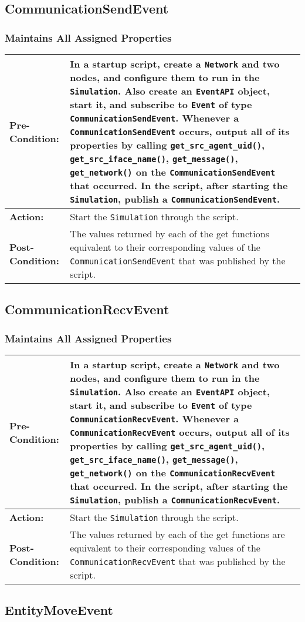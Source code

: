 \documentclass[titlepage]{article}
\newcommand{\testcase}[3]{
    \begin{center}
    \begin{tabular}{| l | p{0.7\textwidth}|}
        \hline
        \rowcolor[gray]{0.8}\textbf{Pre-Condition:} & #1 \\ \hline
        \textbf{Action:} & #2 \\ \hline
        \rowcolor[gray]{0.8}\textbf{Post-Condition:} & #3 \\ \hline
    \end{tabular}
    \end{center}
}
\begin{document}
\subsection{CommunicationSendEvent}
\subsubsection{Maintains All Assigned Properties}
\testcase{In a startup script, create a \texttt{Network} and two nodes, and configure them to run in the \texttt{Simulation}. Also create an \texttt{EventAPI} object, start it, and subscribe to \texttt{Event} of type \texttt{CommunicationSendEvent}. Whenever a \texttt{CommunicationSendEvent} occurs, output all of its properties by calling \texttt{get\_src\_agent\_uid()}, \texttt{get\_src\_iface\_name()}, \texttt{get\_message()}, \texttt{get\_network()} on the \texttt{CommunicationSendEvent} that occurred. In the script, after starting the \texttt{Simulation}, publish a \texttt{CommunicationSendEvent}.}{Start the \texttt{Simulation} through the script.}{The values returned by each of the get functions equivalent to their corresponding values of the \texttt{CommunicationSendEvent} that was published by the script.}

\subsection{CommunicationRecvEvent}
\subsubsection{Maintains All Assigned Properties}
\testcase{In a startup script, create a \texttt{Network} and two nodes, and configure them to run in the \texttt{Simulation}. Also create an \texttt{EventAPI} object, start it, and subscribe to \texttt{Event} of type \texttt{CommunicationRecvEvent}. Whenever a \texttt{CommunicationRecvEvent} occurs, output all of its properties by calling \texttt{get\_src\_agent\_uid()}, \texttt{get\_src\_iface\_name()}, \texttt{get\_message()}, \texttt{get\_network()} on the \texttt{CommunicationRecvEvent} that occurred. In the script, after starting the \texttt{Simulation}, publish a \texttt{CommunicationRecvEvent}.}{Start the \texttt{Simulation} through the script.}{The values returned by each of the get functions are equivalent to their corresponding values of the \texttt{CommunicationRecvEvent} that was published by the script.}

\subsection{EntityMoveEvent}
\end{document}
